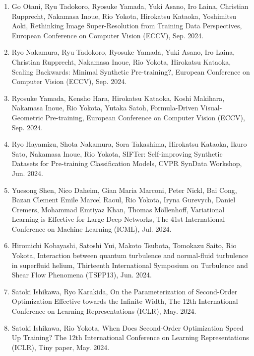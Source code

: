 \documentclass[margin,line]{cv}
\begin{document}
\begin{resume}
\begin{enumerate}
\item Go Otani, Ryu Tadokoro, Ryosuke Yamada, Yuki Asano, Iro Laina, Christian Rupprecht, Nakamasa Inoue, Rio Yokota, Hirokatsu Kataoka, Yoshimitsu Aoki, Rethinking Image Super-Resolution from Training Data Perspectives, European Conference on Computer Vision (ECCV), Sep. 2024.

\item Ryo Nakamura, Ryu Tadokoro, Ryosuke Yamada, Yuki Asano, Iro Laina, Christian Rupprecht, Nakamasa Inoue, Rio Yokota, Hirokatsu Kataoka, Scaling Backwards: Minimal Synthetic Pre-training?, European Conference on Computer Vision (ECCV), Sep. 2024.

\item Ryosuke Yamada, Kensho Hara, Hirokatsu Kataoka, Koshi Makihara, Nakamasa Inoue, Rio Yokota, Yutaka Satoh, Formula-Driven Visual-Geometric Pre-training, European Conference on Computer Vision (ECCV), Sep. 2024.

\item Ryo Hayamizu, Shota Nakamura, Sora Takashima, Hirokatsu Kataoka, Ikuro Sato, Nakamasa Inoue, Rio Yokota, SIFTer: Self-improving Synthetic Datasets for Pre-training Classification Models, CVPR SynData Workshop, Jun. 2024.

\item Yuesong Shen, Nico Daheim, Gian Maria Marconi, Peter Nickl, Bai Cong, Bazan Clement Emile Marcel Raoul, Rio Yokota, Iryna Gurevych, Daniel Cremers, Mohammad Emtiyaz Khan, Thomas M\"{o}llenhoff, Variational Learning is Effective for Large Deep Networks, The 41st International Conference on Machine Learning (ICML), Jul. 2024.

\item Hiromichi Kobayashi, Satoshi Yui, Makoto Tsubota, Tomokazu Saito, Rio Yokota, Interaction between quantum turbulence and normal-fluid turbulence in superfluid helium, Thirteenth International Symposium on Turbulence and Shear Flow Phenomena (TSFP13), Jun. 2024.

\item Satoki Ishikawa, Ryo Karakida, On the Parameterization of Second-Order Optimization Effective towards the Infinite Width, The 12th International Conference on Learning Representations (ICLR), May. 2024.

\item Satoki Ishikawa, Rio Yokota, When Does Second-Order Optimization Speed Up Training? The 12th International Conference on Learning Representations (ICLR), Tiny paper, May. 2024.


\end{enumerate}
\end{resume}
\end{document}

